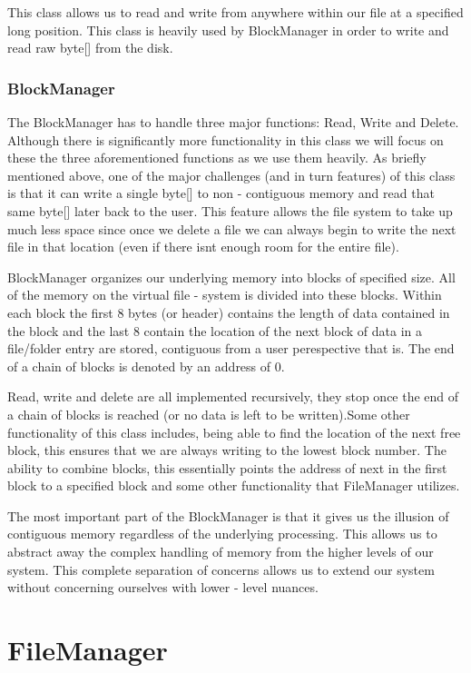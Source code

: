 \documentclass[12pt]{article}
\begin{document}
This class allows us to read and write from anywhere within our file at a specified long position.  This class is heavily used by BlockManager in order to write and read raw byte[] from the disk.

\subsubsection{BlockManager}
The BlockManager has to handle three major functions: Read, Write and Delete.  Although there is significantly more functionality in this class we will focus on these the three aforementioned functions as we use them heavily.  As briefly mentioned above,  one of the major challenges (and in turn features) of this class is that it can write a single byte[] to non - contiguous memory and read that same byte[] later back to the user. This feature allows the file system to take up much less space since once we delete a file we can always begin to write the next file in that location (even if there isnt enough room for the entire file).

BlockManager organizes our underlying memory into blocks of specified size. All of the memory on the virtual file - system is divided into these blocks. Within each block the first 8 bytes (or header) contains the length of data contained in the block and the last 8 contain the location of the next block of data in a file/folder entry are stored, contiguous from a user perespective that is.  The end of a chain of blocks is denoted by an address of 0.

Read, write and delete are all implemented recursively, they stop once the end of a chain of blocks is reached (or no data is left to be written).Some other functionality of this class includes, being able to find the location of the next free block, this ensures that we are always writing to the lowest block number.  The ability to combine blocks, this essentially points the address of next in the first block to a specified block and some other functionality that FileManager utilizes.

The most important part of the BlockManager is that it gives us the illusion of contiguous memory regardless of the underlying processing. This allows us to abstract away the complex handling of memory from the higher levels of our system. This complete separation of concerns allows us to extend our system without concerning ourselves with lower - level nuances.

\section{FileManager}
\end{document}
